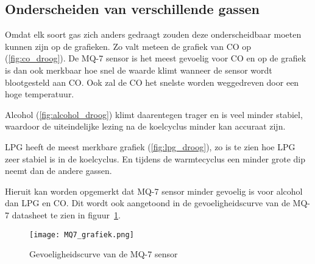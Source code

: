 \subsection{Onderscheiden van verschillende gassen}
\label{subsec:onderscheiding_gassen}


Omdat elk soort gas zich anders gedraagt zouden deze onderscheidbaar moeten kunnen zijn op de grafieken. Zo valt meteen de grafiek van CO op (\ref{fig:co_droog}). De MQ-7 sensor is het meest gevoelig voor CO en op de grafiek is dan ook merkbaar hoe snel de waarde klimt wanneer de sensor wordt blootgesteld aan CO. Ook zal de CO het snelste worden weggedreven door een hoge temperatuur.

Alcohol (\ref{fig:alcohol_droog}) klimt daarentegen trager en is veel minder stabiel, waardoor de uiteindelijke lezing na de koelcyclus minder kan accuraat zijn.

LPG heeft de meest merkbare grafiek (\ref{fig:lpg_droog}), zo is te zien hoe LPG zeer stabiel is in de koelcyclus. En tijdens de warmtecyclus een minder grote dip neemt dan de andere gassen. 

Hieruit kan worden opgemerkt dat MQ-7 sensor minder gevoelig is voor alcohol dan LPG en CO. Dit wordt ook aangetoond in de gevoeligheidscurve van de MQ-7 datasheet
te zien in figuur~\ref{fig:MQ7_grafiek}.

\begin{figure}[h]
    \texttt{[image: MQ7\_grafiek.png]}
    \caption[Gevoeligheidscurve MQ-7]{Gevoeligheidscurve van de MQ-7 sensor
    }
    \label{fig:MQ7_grafiek}
\end{figure}













